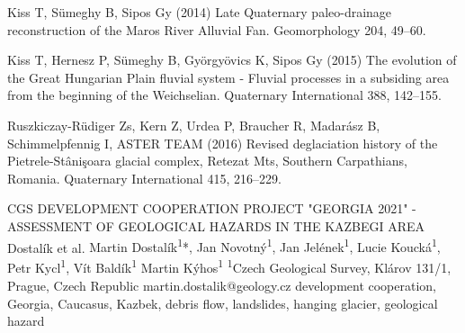 {Kiss T, Sümeghy B, Sipos Gy (2014) Late Quaternary paleo-drainage reconstruction of the Maros River Alluvial Fan. Geomorphology 204, 49–60.
	
Kiss T, Hernesz P, Sümeghy B, Györgyövics K, Sipos Gy (2015) The evolution of the Great Hungarian Plain fluvial system - Fluvial processes in a subsiding area from the beginning of the Weichselian. Quaternary International 388, 142–155. 
	
Ruszkiczay-Rüdiger Zs, Kern Z, Urdea P, Braucher R, Madarász B, Schimmelpfennig I, ASTER TEAM (2016) Revised deglaciation history of the Pietrele-Stânişoara glacial complex, Retezat Mts, Southern Carpathians, Romania. Quaternary International 415, 216–229.
}%

\abstract
{CGS DEVELOPMENT COOPERATION PROJECT "GEORGIA 2021" - ASSESSMENT OF GEOLOGICAL HAZARDS IN THE KAZBEGI AREA} 
{Dostalík et al.} 
{Martin Dostalík\textsuperscript{1}*, Jan Novotný\textsuperscript{1}, Jan Jelének\textsuperscript{1}, Lucie Koucká\textsuperscript{1}, Petr Kycl\textsuperscript{1}, Vít Baldík\textsuperscript{1} Martin Kýhos\textsuperscript{1}} 
{\KLtag} 
{
	\textsuperscript{1}Czech Geological Survey, Klárov 131/1, Prague, Czech Republic
}
{martin.dostalik@geology.cz}  %
{development cooperation, Georgia, Caucasus, Kazbek, debris flow, landslides, hanging glacier, geological hazard}
